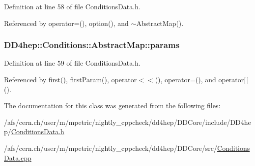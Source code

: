 Definition at line 58 of file ConditionsData.h.

Referenced by operator=(), option(), and $\sim$AbstractMap().\hypertarget{class_d_d4hep_1_1_conditions_1_1_abstract_map_ae2e1b9489f65c31a0bb1c1851686cca4}{
\subsubsection[{params}]{ {\bf DD4hep::Conditions::AbstractMap::params}}}
\label{class_d_d4hep_1_1_conditions_1_1_abstract_map_ae2e1b9489f65c31a0bb1c1851686cca4}


Definition at line 59 of file ConditionsData.h.

Referenced by first(), firstParam(), operator$<$$<$(), operator=(), and operator\mbox{[}$\,$\mbox{]}().

The documentation for this class was generated from the following files:\begin{DoxyCompactItemize}
\item 
/afs/cern.ch/user/m/mpetric/nightly\_\-cppcheck/dd4hep/DDCore/include/DD4hep/\hyperlink{_conditions_data_8h}{ConditionsData.h}\item 
/afs/cern.ch/user/m/mpetric/nightly\_\-cppcheck/dd4hep/DDCore/src/\hyperlink{_conditions_data_8cpp}{ConditionsData.cpp}\end{DoxyCompactItemize}
